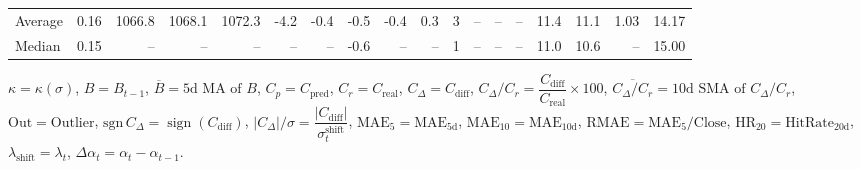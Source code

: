 \begin{threeparttable}
{\begin{tabular}{lrrrrrrrrrrrrrrrrr}
Average &     0.16 & 1066.8 & 1068.1 & 1072.3 &       -4.2 &           -0.4 &                      -0.5 &                     -0.4 &                 0.3 &              3 &         -- &        -- &             -- &             11.4 &                11.1 &            1.03 &                  14.17 \\
 Median &     0.15 &     -- &     -- &     -- &         -- &             -- &                      -0.6 &                       -- &                  -- &              1 &         -- &        -- &             -- &             11.0 &                10.6 &              -- &                  15.00 \\
\bottomrule
\end{tabular}
}
\begin{tablenotes}\footnotesize
\item $\kappa=\kappa(\sigma)$, $B=B_{t-1}$, $\overline{B}=\text{5d MA of }B$, $C_p=C_{\text{pred}}$, $C_r=C_{\text{real}}$, $C_\Delta=C_{\text{diff}}$, $C_\Delta/C_r=\dfrac{C_{\text{diff}}}{C_{\text{real}}}\times100$, $\overline{C_\Delta/C_r}=\text{10d SMA of }C_\Delta/C_r$, $\mathrm{Out}=\text{Outlier}$, $\mathrm{sgn}\,C_\Delta=\operatorname{sign}(C_{\text{diff}})$, $|C_\Delta|/\sigma=\dfrac{|C_{\text{diff}}|}{\sigma_t^{\text{shift}}}$, $\mathrm{MAE}_5=\mathrm{MAE}_{5\text{d}}$, $\mathrm{MAE}_{10}=\mathrm{MAE}_{10\text{d}}$, $\mathrm{RMAE}= \mathrm{MAE}_5 / \text{Close}$, $\mathrm{HR}_{20}=\mathrm{HitRate}_{20\text{d}}$, $\lambda_{\text{shift}}=\lambda_t$, $\Delta\alpha_t=\alpha_t-\alpha_{t-1}$.
\end{tablenotes}
\end{threeparttable}
\endgroup

